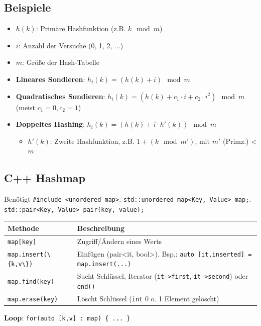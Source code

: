 \documentclass[9pt, landscape]{article}
\newcommand{\formel}[1]{\ensuremath{#1}}
\newcommand{\datastruct}[1]{\textbf{\textcolor{red!60!black}{#1}}}
\begin{document}
\begin{multicols*}{4}
\subsection*{Beispiele}

\begin{itemize}
    \item \formel{h(k)}: Primäre Hashfunktion (z.B. \formel{k \mod m})
    \item \formel{i}: Anzahl der Versuche (0, 1, 2, ...)
    \item \formel{m}: Größe der Hash-Tabelle
\end{itemize}

\noindent\hrulefill

\begin{itemize} 
\item \datastruct{Lineares Sondieren}: \formel{h_i(k) = (h(k) + i) \mod m}
\item \datastruct{Quadratisches Sondieren}:  \formel{h_i(k) = (h(k) + c_1 \cdot i + c_2 \cdot i^2) \mod m} (meist $c_1 = 0, c_2 = 1$)

\item \datastruct{Doppeltes Hashing}: \formel{h_i(k) = (h(k) + i \cdot h'(k)) \mod m}

\begin{itemize}
    \item \formel{h'(k)}: Zweite Hashfunktion, z.B. \formel{1 + (k \mod m')}, mit \formel{m'} (Primz.) < \formel{m}
\end{itemize}
\end{itemize}

\subsection*{C++ Hashmap}
Benötigt \lstinline|#include <unordered_map>|. \lstinline|std::unordered_map<Key, Value> map;|. \lstinline|std::pair<Key, Value> pair(key, value);|

\noindent
\begin{tabularx}{\linewidth}{l >{\RaggedRight}X}
\toprule
\textbf{Methode} & \textbf{Beschreibung} \\
\midrule
\lstinline|map[key]| & Zugriff/Ändern eines Werts \\
\lstinline|map.insert(\{k,v\})| & Einfügen (pair<it, bool>). Bsp.: \lstinline|auto [it,inserted] = map.insert(...)| \\
\lstinline|map.find(key)| & Sucht Schlüssel, Iterator (\lstinline|it->first|, \lstinline|it->second|) oder \lstinline|end()| \\
\lstinline|map.erase(key)| & Löscht Schlüssel (\lstinline|int| 0 o. 1 Element gelöscht) \\
\bottomrule
\end{tabularx}
\datastruct{Loop}: \lstinline|for(auto [k,v] : map) { ... }|


\end{multicols*}
\end{document}
